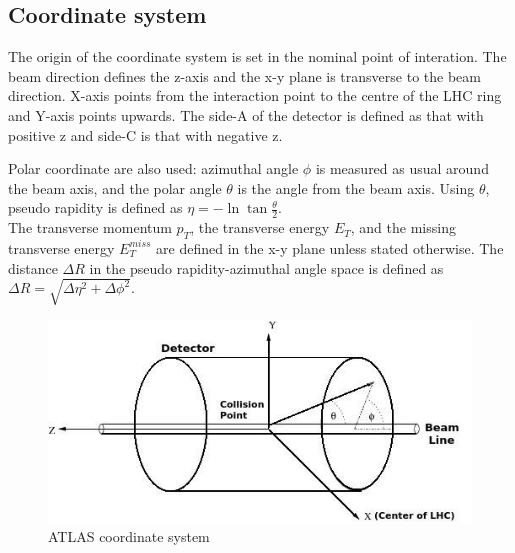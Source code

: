 \documentclass[a4paper, oneside]{book}
\begin{document}
				\subsection{Coordinate system}
					\cite{ATLAS config}The origin of the coordinate system is set in the nominal point of interation. The beam direction defines the z-axis and the x-y plane is transverse to the beam direction. X-axis points from the interaction point to the centre of the LHC ring and Y-axis points upwards. The side-A of the detector is defined as that with positive z and side-C is that with negative z.
					
					Polar coordinate are also used: azimuthal angle $\phi$ is measured as usual around the beam axis, and the polar angle $\theta$ is the angle from the beam axis. Using $\theta$, pseudo rapidity is defined as $\eta= -\ln{\tan{\frac{\theta}{2}}}$. \\
					The transverse momentum $p_T$, the transverse energy $E_T$, and the missing transverse energy $E_T^{miss}$ are defined in the x-y plane unless stated otherwise.  The distance $\Delta R$ in the pseudo rapidity-azimuthal angle space is defined as $\Delta R = \sqrt{\Delta \eta^2 + \Delta \phi^2 }$.
					\begin{figure}[H]
						\centering
						\includegraphics[width=0.3\textheight]{tesi_images/atlas_coord.jpeg}
						\caption{ATLAS coordinate system}
					\end{figure}
\end{document}
